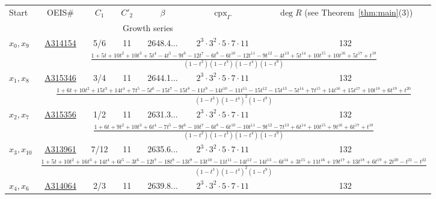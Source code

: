 \renewcommand{\arraystretch}{1.8}
\begin{table}[htp]

\vspace{5mm}

\centering
\begin{sideways}
\begin{tabular}{l||cccccc} \hline
\multirow{2}{*}{Start} & OEIS\# & $C_1$ & $C'_2$ & $\beta$ & $\operatorname{cpx}_{\Gamma}$ & $\deg R$ (see Theorem~\ref{thm:main}(3))  \\
& \multicolumn{5}{c}{Growth series} \\
\hline \hline
\multirow{2}{*}{$x_0, x_9$} & \underline{A314154} & 5/6 & 11 & 2648.4... & $2^3 \cdot 3^2 \cdot 5 \cdot 7 \cdot 11$ & 132 \\
& \multicolumn{6}{c}{\Large $\frac{1+5 t+10 t^{2}+10 t^{3}+5 t^{4}-4 t^{5}-9 t^{6}-12 t^{7}-6 t^{8}-6 t^{10}-12 t^{11}-9 t^{12}-4 t^{13}+5 t^{14}+10 t^{15}+10 t^{16}+5 t^{17}+t^{18}}{(1 - t^2)(1-t^3)(1-t^4)(1-t^9)}$} \\
\hline
\multirow{2}{*}{$x_1, x_8$} & \underline{A315346} & 3/4 & 11 & 2644.1... & $2^3 \cdot 3^2 \cdot 5 \cdot 7 \cdot 11$ & 132 \\
& \multicolumn{6}{c}{\Large $\frac{1+6 t+10 t^{2}+15 t^{3}+14 t^{4}+7 t^{5}-5 t^{6}-15 t^{7}-15 t^{8}-11 t^{9}-14 t^{10}-11 t^{11}-15 t^{12}-15 t^{13}-5 t^{14}+7 t^{15}+14 t^{16}+15 t^{17}+10 t^{18}+6 t^{19}+t^{20}}{(1 - t^3)(1 - t^4)^2(1-t^9)}$} \\
\hline
\multirow{2}{*}{$x_2, x_7$} & \underline{A315356} & 1/2 & 11 & 2631.3... & $2^3 \cdot 3^2 \cdot 5 \cdot 7 \cdot 11$ & 132 \\
& \multicolumn{6}{c}{\Large $\frac{1+6 t+9 t^{2}+10 t^{3}+6 t^{4}-7 t^{5}-9 t^{6}-10 t^{7}-6 t^{8}-6 t^{10}-10 t^{11}-9 t^{12}-7 t^{13}+6 t^{14}+10 t^{15}+9 t^{16}+6 t^{17}+t^{18}}{(1 - t^2)(1-t^3)(1-t^4)(1-t^9)}$} \\
\hline
\multirow{2}{*}{$x_3, x_{10}$} & \underline{A313961} & 7/12 & 11 & 2635.6... & $2^3 \cdot 3^2 \cdot 5 \cdot 7 \cdot 11$ & 132 \\
& \multicolumn{6}{c}{\Large $\frac{1+5 t+10 t^{2}+16 t^{3}+14 t^{4}+6 t^{5}-3 t^{6}-12 t^{7}-18 t^{8}-13 t^{9}-13 t^{10}-11 t^{11}-14 t^{12}-14 t^{13}-6 t^{14}+3 t^{15}+11 t^{16}+19 t^{17}+13 t^{18}+6 t^{19}+2 t^{20}-t^{21}-t^{22}}{(1 - t^3)(1 - t^4)^2(1-t^9)}$} \\
\hline
\multirow{2}{*}{$x_4, x_6$} & \underline{A314064} & 2/3 & 11 & 2639.8... & $2^3 \cdot 3^2 \cdot 5 \cdot 7 \cdot 11$ & 132 \\

\end{tabular}
\end{sideways}
\end{table}
